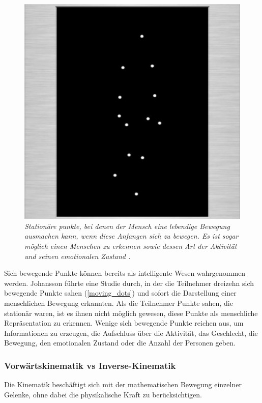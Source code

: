 \documentclass[a4paper,11pt]{article}%
\renewcommand{\\}{\vspace*{0.5\baselineskip} \newline}
\begin{document}
\begin{figure}[b!]
		\begin{footnotesize}
		\centering
			\includegraphics[scale= 0.5]{Abbildungen/moving_dots.JPG}
			\caption[Moving dots]{\textit{Stationäre punkte, bei denen der Mensch eine lebendige Bewegung ausmachen kann, wenn diese Anfangen sich zu bewegen. Es ist sogar möglich einen Menschen zu erkennen sowie dessen Art der Aktivität und seinen emotionalen Zustand \citep{biocca2002defining} \citep[p.76-89]{johansson1975visual}.}}
			\label{moving_dots}
		\end{footnotesize}
	\end{figure}

Sich bewegende Punkte können bereits als intelligente Wesen wahrgenommen werden. Johansson \citep[p.76-89]{johansson1975visual} führte eine Studie durch, in der die Teilnehmer dreizehn sich bewegende Punkte sahen (\autoref{moving_dots}) und sofort die Darstellung einer menschlichen Bewegung erkannten. Als die Teilnehmer Punkte sahen, die stationär waren, ist es ihnen nicht möglich gewesen, diese Punkte als menschliche Repräsentation zu erkennen. Wenige sich bewegende Punkte reichen aus, um Informationen zu erzeugen, die Aufschluss über die Aktivität, das Geschlecht, die Bewegung, den emotionalen Zustand oder die Anzahl der Personen geben.

\subsubsection{Vorwärtskinematik vs Inverse-Kinematik}
Die Kinematik beschäftigt sich mit der mathematischen Bewegung einzelner Gelenke, ohne dabei die physikalische Kraft zu berücksichtigen. \citep[p.1]{beggs1983kinematics}
\end{document}
